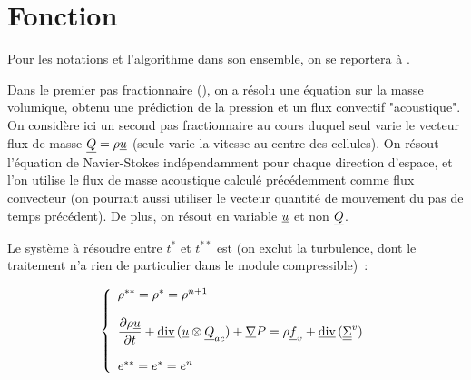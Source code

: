 
%
%
%
%


%
\vspace{1cm}
\section*{Fonction}

Pour les notations et l'algorithme dans son ensemble,
on se reportera \`a .

Dans le premier pas fractionnaire (), on a r\'esolu une
\'equation sur la masse volumique, obtenu une pr\'ediction de la pression
et un flux convectif "acoustique".
On consid\`ere ici un second pas fractionnaire au cours duquel seul varie
le vecteur flux de masse $\underline{Q}=\rho\underline{u}$
(seule varie la vitesse au centre des cellules).
On r\'esout l'\'equation de Navier-Stokes ind\'ependamment
pour chaque direction d'espace, et l'on utilise le flux de masse acoustique
calcul\'e pr\'ec\'edemment comme flux convecteur (on pourrait aussi utiliser
le vecteur quantit\'e de mouvement du pas de temps pr\'ec\'edent).
De plus, on r\'esout en variable $\underline{u}$ et non $\underline{Q}$.

Le syst\`eme \`a r\'esoudre entre $t^*$ et $t^{**}$ est (on exclut
la turbulence, dont le traitement n'a rien de particulier dans le
module compressible)~:

\begin{equation}\label{Cfbl_Cfqdmv_eq_qdm_cfqdmv}
\left\{\begin{array}{l}

\rho^{**}=\rho^{*}=\rho^{n+1}\\
\\
\displaystyle\frac{\partial \rho\underline{u}}{\partial t}+
\underline{\text{div}}\,(\underline{u} \otimes \underline{Q}_{ac}) + \underline{\nabla}{P}
= \rho \underline{f}_v + \underline{\text{div}}\,(\underline{\underline{\Sigma}}^v)\\
\\
e^{**}=e^{*}=e^n\\

\end{array}\right.
\end{equation}

